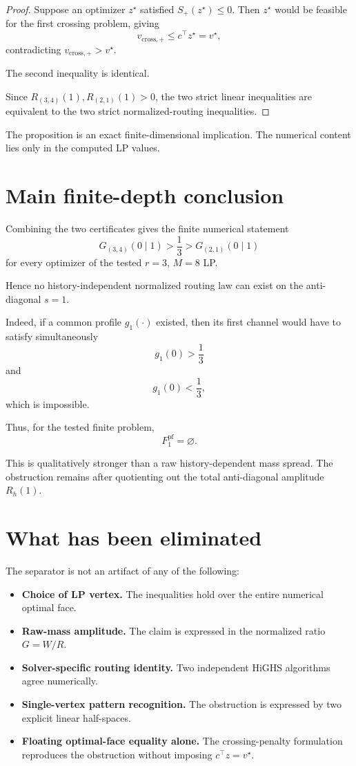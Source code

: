 \documentclass[11pt,a4paper]{article}
\newcommand{\opt}{v^\star}
\newcommand{\Rp}{R_{(3,4)}(1)}
\newcommand{\Rm}{R_{(2,1)}(1)}
\begin{document}
\begin{proof}
Suppose an optimizer \(z^\star\) satisfied \(S_+(z^\star)\le0\).
Then \(z^\star\) would be feasible for the first crossing problem, giving
\[
v_{\mathrm{cross},+}
\le
c^\top z^\star
=
\opt,
\]
contradicting \(v_{\mathrm{cross},+}>\opt\).

The second inequality is identical.

Since \(\Rp,\Rm>0\), the two strict linear inequalities are equivalent to the
two strict normalized-routing inequalities.
\end{proof}

The proposition is an exact finite-dimensional implication.
The numerical content lies only in the computed LP values.

\section{Main finite-depth conclusion}

Combining the two certificates gives the finite numerical statement
\[
\boxed{
G_{(3,4)}(0\mid1)
>
\frac13
>
G_{(2,1)}(0\mid1)
}
\]
for every optimizer of the tested \(r=3\), \(M=8\) LP.

Hence no history-independent normalized routing law can exist on the
anti-diagonal \(s=1\).

Indeed, if a common profile \(g_1(\cdot)\) existed, then its first channel
would have to satisfy simultaneously
\[
g_1(0)>\frac13
\]
and
\[
g_1(0)<\frac13,
\]
which is impossible.

Thus, for the tested finite problem,
\[
\boxed{
F^{\mathrm{pf}}_1=\varnothing.
}
\]

This is qualitatively stronger than a raw history-dependent mass spread.
The obstruction remains after quotienting out the total anti-diagonal
amplitude \(R_h(1)\).

\section{What has been eliminated}

The separator is not an artifact of any of the following:

\begin{itemize}
\item \textbf{Choice of LP vertex.}
      The inequalities hold over the entire numerical optimal face.
\item \textbf{Raw-mass amplitude.}
      The claim is expressed in the normalized ratio \(G=W/R\).
\item \textbf{Solver-specific routing identity.}
      Two independent HiGHS algorithms agree numerically.
\item \textbf{Single-vertex pattern recognition.}
      The obstruction is expressed by two explicit linear half-spaces.
\item \textbf{Floating optimal-face equality alone.}
      The crossing-penalty formulation reproduces the obstruction without
      imposing \(c^\top z=\opt\).
\end{itemize}
\end{document}
